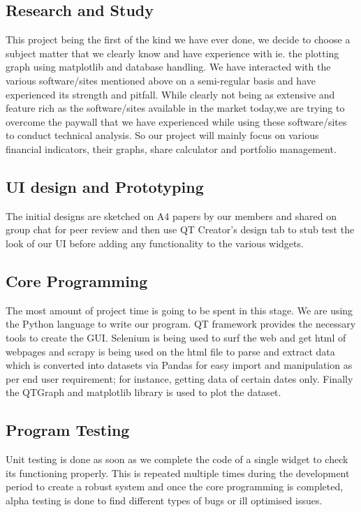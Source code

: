 \documentclass{article}
\begin{document}
\subsection{Research and Study}
This project being the first of the kind we have ever done, we decide to choose a subject matter that we clearly know and have experience with ie. the plotting graph 
using matplotlib and database handling. We have interacted with the various software/sites mentioned above on a semi-regular basis and have experienced its strength 
and pitfall. While clearly not being as extensive and feature rich as the software/sites available in the market today,we are trying to overcome the paywall  that 
we have experienced while using these software/sites to conduct technical analysis. So our project will mainly focus on various financial indicators, their graphs, 
share calculator and portfolio management.

\subsection{UI design and Prototyping}
The initial designs are sketched on A4 papers by our members and shared on group chat for peer review and then use QT Creator’s design tab to stub test the look 
of our UI before adding any functionality to the various widgets.

\subsection{Core Programming}
The most amount of project time is going to be spent in this stage. We are using the Python language to write our program. QT framework provides the necessary 
tools to create the GUI. Selenium is being used to surf the web and get html of webpages and scrapy is being used on the html file to parse and extract data 
which is converted into datasets via Pandas for easy import and manipulation as per end user requirement; for instance, getting data of certain dates only. 
Finally the QTGraph and matplotlib library is used to plot the dataset.

\subsection{Program Testing}
Unit testing is done as soon as we complete the code of a single widget to check its functioning properly. This is repeated multiple times during the development 
period to create a robust system and once the core programming is completed, alpha testing is done to find different types of bugs or ill optimised issues.
\end{document}
